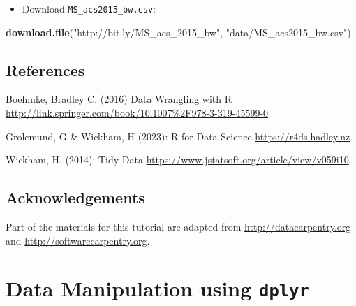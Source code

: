 \documentclass[
]{book}
\newenvironment{Shaded}{\begin{snugshade}}{\end{snugshade}}
\newcommand{\FunctionTok}[1]{\textcolor[rgb]{0.13,0.29,0.53}{\textbf{#1}}}
\newcommand{\NormalTok}[1]{#1}
\newcommand{\StringTok}[1]{\textcolor[rgb]{0.31,0.60,0.02}{#1}}
\providecommand{\tightlist}{%
  \setlength{\itemsep}{0pt}\setlength{\parskip}{0pt}}
\begin{document}
\begin{itemize}
\tightlist
\item
  Download \texttt{MS\_acs2015\_bw.csv}:
\end{itemize}

\begin{Shaded}
\begin{Highlighting}[]
\FunctionTok{download.file}\NormalTok{(}\StringTok{"http://bit.ly/MS\_acs\_2015\_bw"}\NormalTok{,}
              \StringTok{"data/MS\_acs2015\_bw.csv"}\NormalTok{)}
\end{Highlighting}
\end{Shaded}

\hypertarget{references}{%
\section*{References}\label{references}}

Boehmke, Bradley C. (2016) Data Wrangling with R
\url{http://link.springer.com/book/10.1007\%2F978-3-319-45599-0}

Grolemund, G \& Wickham, H (2023): R for Data Science \url{https://r4ds.hadley.nz}

Wickham, H. (2014): Tidy Data \url{https://www.jstatsoft.org/article/view/v059i10}

\hypertarget{acknowledgements}{%
\section*{Acknowledgements}\label{acknowledgements}}

Part of the materials for this tutorial are adapted from \url{http://datacarpentry.org} and \url{http://softwarecarpentry.org}.

\hypertarget{dplyr}{%
\chapter{\texorpdfstring{Data Manipulation using \textbf{\texttt{dplyr}}}{Data Manipulation using dplyr}}\label{dplyr}}
\end{document}
